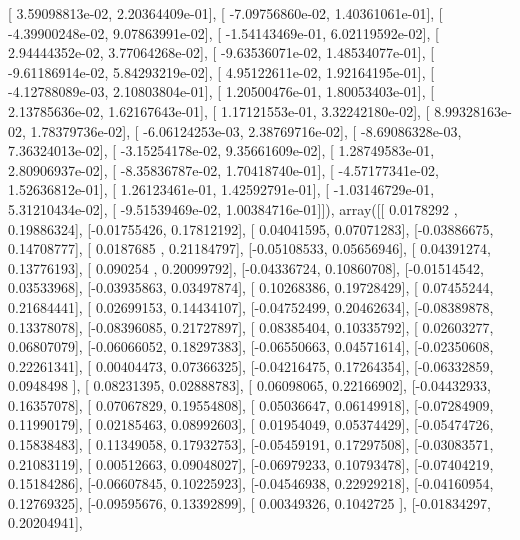 \documentclass{article}
\begin{document}
       [  3.59098813e-02,   2.20364409e-01],
       [ -7.09756860e-02,   1.40361061e-01],
       [ -4.39900248e-02,   9.07863991e-02],
       [ -1.54143469e-01,   6.02119592e-02],
       [  2.94444352e-02,   3.77064268e-02],
       [ -9.63536071e-02,   1.48534077e-01],
       [ -9.61186914e-02,   5.84293219e-02],
       [  4.95122611e-02,   1.92164195e-01],
       [ -4.12788089e-03,   2.10803804e-01],
       [  1.20500476e-01,   1.80053403e-01],
       [  2.13785636e-02,   1.62167643e-01],
       [  1.17121553e-01,   3.32242180e-02],
       [  8.99328163e-02,   1.78379736e-02],
       [ -6.06124253e-03,   2.38769716e-02],
       [ -8.69086328e-03,   7.36324013e-02],
       [ -3.15254178e-02,   9.35661609e-02],
       [  1.28749583e-01,   2.80906937e-02],
       [ -8.35836787e-02,   1.70418740e-01],
       [ -4.57177341e-02,   1.52636812e-01],
       [  1.26123461e-01,   1.42592791e-01],
       [ -1.03146729e-01,   5.31210434e-02],
       [ -9.51539469e-02,   1.00384716e-01]]), array([[ 0.0178292 ,  0.19886324],
       [-0.01755426,  0.17812192],
       [ 0.04041595,  0.07071283],
       [-0.03886675,  0.14708777],
       [ 0.0187685 ,  0.21184797],
       [-0.05108533,  0.05656946],
       [ 0.04391274,  0.13776193],
       [ 0.090254  ,  0.20099792],
       [-0.04336724,  0.10860708],
       [-0.01514542,  0.03533968],
       [-0.03935863,  0.03497874],
       [ 0.10268386,  0.19728429],
       [ 0.07455244,  0.21684441],
       [ 0.02699153,  0.14434107],
       [-0.04752499,  0.20462634],
       [-0.08389878,  0.13378078],
       [-0.08396085,  0.21727897],
       [ 0.08385404,  0.10335792],
       [ 0.02603277,  0.06807079],
       [-0.06066052,  0.18297383],
       [-0.06550663,  0.04571614],
       [-0.02350608,  0.22261341],
       [ 0.00404473,  0.07366325],
       [-0.04216475,  0.17264354],
       [-0.06332859,  0.0948498 ],
       [ 0.08231395,  0.02888783],
       [ 0.06098065,  0.22166902],
       [-0.04432933,  0.16357078],
       [ 0.07067829,  0.19554808],
       [ 0.05036647,  0.06149918],
       [-0.07284909,  0.11990179],
       [ 0.02185463,  0.08992603],
       [ 0.01954049,  0.05374429],
       [-0.05474726,  0.15838483],
       [ 0.11349058,  0.17932753],
       [-0.05459191,  0.17297508],
       [-0.03083571,  0.21083119],
       [ 0.00512663,  0.09048027],
       [-0.06979233,  0.10793478],
       [-0.07404219,  0.15184286],
       [-0.06607845,  0.10225923],
       [-0.04546938,  0.22929218],
       [-0.04160954,  0.12769325],
       [-0.09595676,  0.13392899],
       [ 0.00349326,  0.1042725 ],
       [-0.01834297,  0.20204941],
\end{document}
